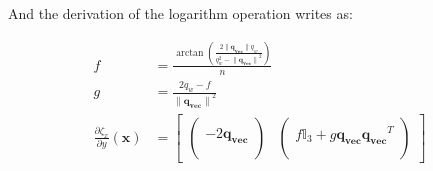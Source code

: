And the derivation of the logarithm operation writes as:

\begin{align}
\label{eq:diffLogSO3Quat}
  f &= \frac{\arctan \left( \frac{2 \|\mathbf{q_{vec}}\| q_w}{q_w^2 - {\|\mathbf{q_{vec}}\|}^2} \right)}{n}\\
  g &= \frac{2 q_w - f}{{\|\mathbf{q_{vec}}\|}^2} \\
  \frac{\partial \zeta_x}{\partial y}(\mathbf{x}) &= \begin{bmatrix}
  \begin{pmatrix}
    \\
    -2\mathbf{q_{vec}}\\
    \\
  \end{pmatrix} &
  \begin{pmatrix}
    \\
    f\mathbb{I}_3 + g\mathbf{q_{vec}}\mathbf{q_{vec}}^T\\
    \\
  \end{pmatrix}
  \end{bmatrix}
\end{align}



